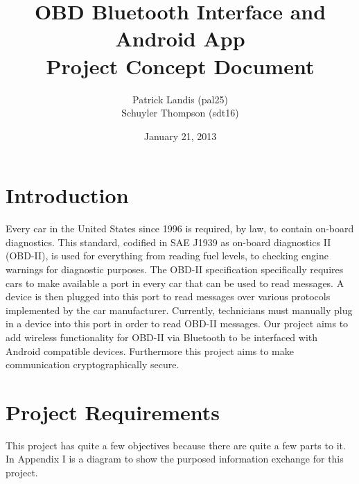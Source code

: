 \documentclass[12pt,letterpaper]{article}
\title{
\textbf{\LARGE OBD Bluetooth Interface and Android App} \\
\Large Project Concept Document
}
\author{
\normalsize Patrick Landis (pal25) \\
\normalsize Schuyler Thompson (sdt16)
}
\date{\normalsize January 21, 2013}
\begin{document}
\maketitle

\section{Introduction}
Every car in the United States since 1996 is required, by law, to contain on-board diagnostics. This standard, codified in SAE J1939 as on-board diagnostics II (OBD-II), is used for everything from reading fuel levels, to checking engine warnings for diagnostic purposes. The OBD-II specification specifically requires cars to make available a port in every car that can be used to read messages. A device is then plugged into this port to read messages over various protocols implemented by the car manufacturer. Currently, technicians must manually plug in a device into this port in order to read OBD-II messages. Our project aims to add wireless functionality for OBD-II via Bluetooth to be interfaced with Android compatible devices. Furthermore this project aims to make communication cryptographically secure.


\section{Project Requirements}
This project has quite a few objectives because there are quite a few parts to it. In Appendix I is a diagram to show the purposed information exchange for this project.
\end{document}
